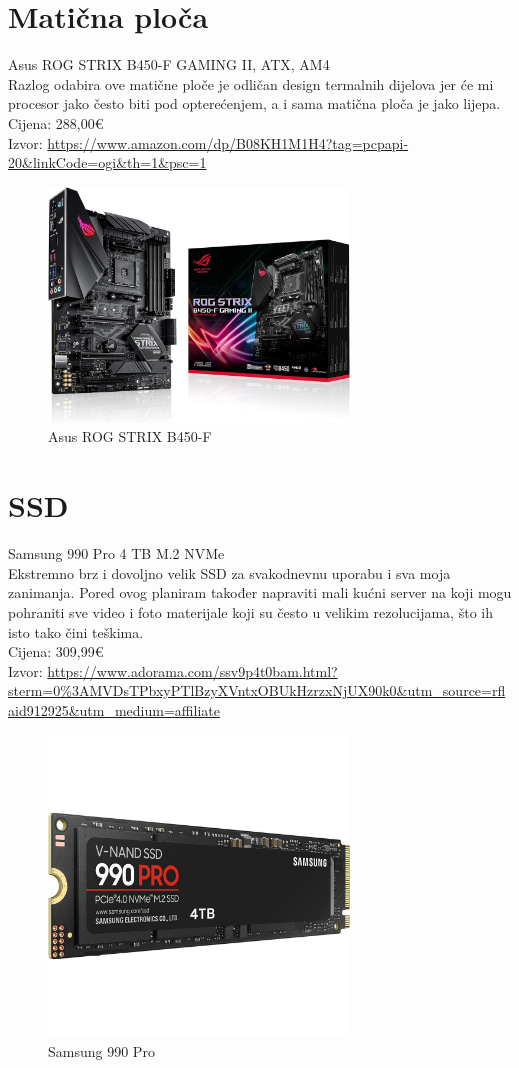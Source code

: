 \documentclass{report}
\begin{document}
\chapter{Matična ploča}
Asus ROG STRIX B450-F GAMING II, ATX, AM4
\\ Razlog odabira ove matične ploče je odličan design termalnih dijelova jer će mi procesor jako često biti pod opterećenjem, a i sama matična ploča je jako lijepa.
\\Cijena: 288,00€
\\Izvor:  \url{https://www.amazon.com/dp/B08KH1M1H4?tag=pcpapi-20&linkCode=ogi&th=1&psc=1}
\begin{figure}[h]
\includegraphics[width=8cm]{slike/maticna.jpg}
\caption{Asus ROG STRIX B450-F}
\end{figure}

\chapter{SSD}
Samsung 990 Pro 4 TB M.2 NVMe
\\ Ekstremno brz i dovoljno velik SSD za svakodnevnu uporabu i sva moja zanimanja. Pored ovog planiram također napraviti mali kućni server na koji mogu pohraniti sve video i foto materijale koji su često u velikim rezolucijama, što ih isto tako čini teškima.
\\Cijena: 309,99€
\\Izvor:  \url{https://www.adorama.com/ssv9p4t0bam.html?sterm=0%3AMVDsTPbxyPTlBzyXVntxOBUkHzrzxNjUX90k0&utm_source=rflaid912925&utm_medium=affiliate}
\begin{figure}[h]
\includegraphics[width=8cm]{slike/ssd.jpg}
\caption{Samsung 990 Pro}
\end{figure}
\end{document}
